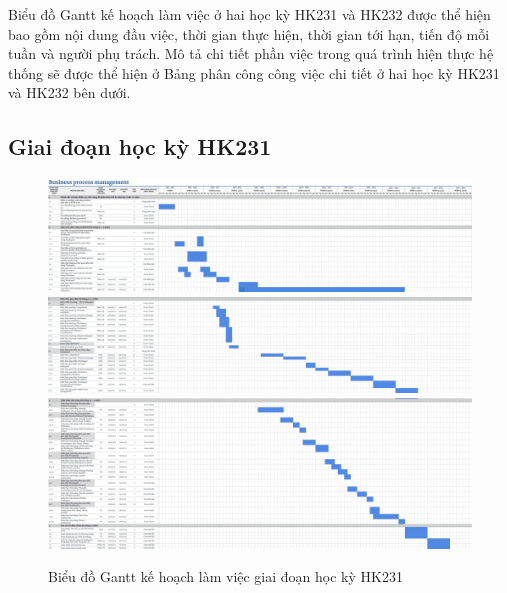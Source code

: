 
Biểu đồ Gantt kế hoạch làm việc ở hai học kỳ HK231 và HK232 được thể hiện bao gồm nội dung đầu việc, thời gian thực hiện, thời gian tới hạn, tiến độ mỗi tuần và người phụ trách. Mô tả chi tiết phần việc trong quá trình hiện thực hệ thống sẽ được thể hiện ở Bảng phân công công việc chi tiết ở hai học kỳ HK231 và HK232 bên dưới.

\subsection{Giai đoạn học kỳ HK231}

\begin{figure} [H]
    \centering
    \includegraphics[width = \linewidth]{Content/Giới thiệu đề tài/images/PCCV_HK231_1.png}
    \includegraphics[width = \linewidth]{Content/Giới thiệu đề tài/images/PCCV_HK231_2.png}
    \includegraphics[width = \linewidth]{Content/Giới thiệu đề tài/images/PCCV_HK231_3.png}
    \vspace{0.5cm}
    \caption{Biểu đồ Gantt kế hoạch làm việc giai đoạn học kỳ HK231}
    \label{fig:Biểu đồ Gantt kế hoạch làm việc giai đoạn học kỳ HK231}
\end{figure}

